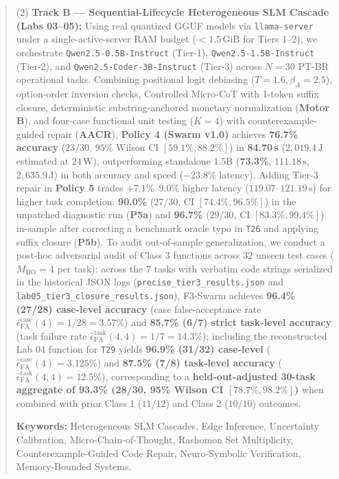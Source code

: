 \documentclass[10pt,a4paper]{article}
\begin{document}
\begin{abstract}
(2) \textbf{Track B — Sequential-Lifecycle Heterogeneous SLM Cascade (Labs 03--05):} Using real quantized GGUF models via \texttt{llama-server} under a single-active-server RAM budget ($<1.5\,\text{GiB}$ for Tiers 1--2), we orchestrate \texttt{Qwen2.5-0.5B-Instruct} (Tier-1), \texttt{Qwen2.5-1.5B-Instruct} (Tier-2), and \texttt{Qwen2.5-Coder-3B-Instruct} (Tier-3) across $N=30$ PT-BR operational tasks. Combining positional logit debiasing ($T=1.6, \beta_A=2.5$), option-order inversion checks, Controlled Micro-CoT with 1-token suffix closure, deterministic substring-anchored monetary normalization (\textbf{Motor B}), and four-case functional unit testing ($K=4$) with counterexample-guided repair (\textbf{AACR}), \textbf{Policy 4 (Swarm v1.0)} achieves \textbf{76.7\% accuracy} ($23/30$, $95\%$ Wilson CI $[59.1\%, 88.2\%]$) in \textbf{84.70\,s} ($2,019.4\,\text{J}$ estimated at $24\,\text{W}$), outperforming standalone $1.5\text{B}$ (\textbf{73.3\%}, $111.18\,\text{s}$, $2,635.9\,\text{J}$) in both accuracy and speed ($-23.8\%$ latency). Adding Tier-3 repair in \textbf{Policy 5} trades $+7.1\%\text{--}9.0\%$ higher latency ($119.07\text{--}121.19\,\text{s}$) for higher task completion: \textbf{90.0\%} ($27/30$, CI $[74.4\%, 96.5\%]$) in the unpatched diagnostic run (\textbf{P5a}) and \textbf{96.7\%} ($29/30$, CI $[83.3\%, 99.4\%]$) in-sample after correcting a benchmark oracle typo in \texttt{T26} and applying suffix closure (\textbf{P5b}). To audit out-of-sample generalization, we conduct a post-hoc adversarial audit of Class 3 functions across $32$ unseen test cases ($M_{\text{HO}}=4$ per task): across the $7$ tasks with verbatim code strings serialized in the historical JSON logs (\texttt{precise\_tier3\_results.json} and \texttt{lab05\_tier3\_closure\_results.json}), F3-Swarm achieves \textbf{96.4\% (27/28) case-level accuracy} (case false-acceptance rate $\hat{\epsilon}_{\text{FA}}^{\text{case}}(4) = 1/28 = 3.57\%$) and \textbf{85.7\% (6/7) strict task-level accuracy} (task failure rate $\hat{\epsilon}_{\text{FA}}^{\text{task}}(4,4) = 1/7 = 14.3\%$); including the reconstructed Lab 04 function for \texttt{T29} yields \textbf{96.9\% (31/32) case-level} ($\hat{\epsilon}_{\text{FA}}^{\text{case}}(4) = 3.125\%$) and \textbf{87.5\% (7/8) task-level accuracy} ($\hat{\epsilon}_{\text{FA}}^{\text{task}}(4,4) = 12.5\%$), corresponding to a \textbf{held-out-adjusted 30-task aggregate of 93.3\% (28/30, 95\% Wilson CI $[78.7\%, 98.2\%]$)} when combined with prior Class 1 ($11/12$) and Class 2 ($10/10$) outcomes.

\vspace{4pt}
\noindent\textbf{\color{primary}Keywords:} Heterogeneous SLM Cascades, Edge Inference, Uncertainty Calibration, Micro-Chain-of-Thought, Rashomon Set Multiplicity, Counterexample-Guided Code Repair, Neuro-Symbolic Verification, Memory-Bounded Systems.
\end{abstract}
\end{document}
